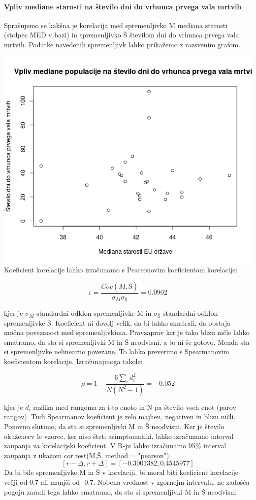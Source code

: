 \documentclass[a4paper,11pt]{article}
\begin{document}
\paragraph{Vpliv mediane starosti na število dni do vrhunca prvega vala mrtvih}
Sprašujemo se kakšna je korelacija med spremenljivko M mediana starosti (stolpec MED v bazi) in spremenljivko Š številom dni do vrhunca prvega vala mrtvih. Podatke navedenih spremenljivk lahko prikažemo z razsvenim grafom.

\includegraphics[scale=0.6]{vpliv_med_pop_na_st_dni_do_peaka_mrtvih}
Koeficient korelacije lahko izračunamo s Pearsonovim koeficientom korelacije:

\begin{center}
\[\text{r} = \frac{Cov(M,Š)}{\sigma_{M} \sigma_{Š}} = 0.0902\]
\end{center} 
kjer je \(\sigma_{M}\) standardni odklon spremenljivke M in \(\sigma_{Š}\) standardni odklon spremenljivke Š. Koeficient ni dovolj velik, da bi lahko smatrali, da obstaja močna povezanost med spremenljivkima. Pravzaprav ker je tako blizu ničle lahko smatramo, da sta si spremenljivki M in Š neodvisni, a to ni še gotovo. Menda sta si spremenljivke nelinearno povezane. To lahko preverimo s Spearmanovim koeficientom korelacije. Izračunajmoga takole: 

\begin{center}
\[\rho = 1 - \frac{6\sum_{i}{}d_i^2}{N(N^2 - 1)} = -0.052\]
\end{center} 

kjer je \( d_i \) razlika med rangoma za i-to enoto in N pa število vseh enot (parov rangov). Tudi Spearmanov koeficient je zelo majhen, negativen in blizu ničli. Ponovno slutimo, da sta si spremenljivki M in Š neodvisni.
Ker je število okuženecv le vzorec, ker niso šteti asimptomatiki, lahko izračunamo interval zaupanja za korelacijski koeficient. V R-ju lahko izračunamo 95\% interval zaupanja z ukazom cor.test(M,Š, method = "pearson").
\[[r - \Delta, r + \Delta] = [-0.3001382, 0.4545977]\]
Da bi bile spremenljivke M in Š v korelaciji, bi moral biti koeficient korelacije večji od 0.7 ali manjši od -0.7. Nobena vrednost v zgornejm intervalu, ne zadošča pogoju zaradi tega lahko smatramo, da sta si spremenljivki M in Š neodvisni.
\end{document}
